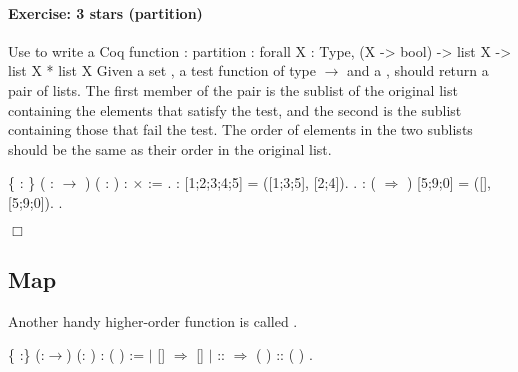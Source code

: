 \documentclass[12pt]{report}
\begin{document}
\paragraph{Exercise: 3 stars (partition)}

 Use  to write a Coq function :
  partition : forall X : Type,
              (X -> bool) -> list X -> list X * list X
   Given a set , a test function of type  \ensuremath{\rightarrow}  and a 
   ,  should return a pair of lists.  The first member of
   the pair is the sublist of the original list containing the
   elements that satisfy the test, and the second is the sublist
   containing those that fail the test.  The order of elements in the
   two sublists should be the same as their order in the original
   list.
\begin{coqdoccode}
\coqdocemptyline
\coqdocnoindent
{}  \{ : \} ( :  \ensuremath{\rightarrow} ) ( :  )\coqdoceol
\coqdocindent{10.50em}
:   \ensuremath{\times}   :=\coqdoceol
\coqdocnoindent
 .\coqdoceol
\coqdocemptyline
\coqdocnoindent
{} :   [1;2;3;4;5] = ([1;3;5], [2;4]).\coqdoceol
 .\coqdoceol
\coqdocnoindent
{} :  (  \ensuremath{\Rightarrow} ) [5;9;0] = ([], [5;9;0]).\coqdoceol
 .\coqdoceol
\end{coqdoccode}
\ensuremath{\Box} \begin{coqdoccode}
\coqdocemptyline
\end{coqdoccode}
\subsection{Map}



 Another handy higher-order function is called . \begin{coqdoccode}
\coqdocemptyline
\coqdocnoindent
{}  \{ :\} (:\ensuremath{\rightarrow}) (: )\coqdoceol
\coqdocindent{6.50em}
: ( ) :=\coqdoceol
\coqdocindent{1.00em}
  \coqdoceol
\coqdocindent{1.00em}
\ensuremath{|} []     \ensuremath{\Rightarrow} []\coqdoceol
\coqdocindent{1.00em}
\ensuremath{|}  ::  \ensuremath{\Rightarrow} ( ) :: (  )\coqdoceol
\coqdocindent{1.00em}
.\coqdoceol
\coqdocemptyline
\end{coqdoccode}
\end{document}
